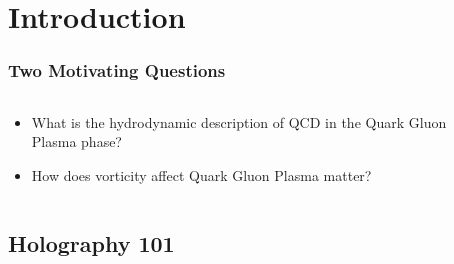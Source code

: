 \documentclass[xcolor=dvipsnames]{beamer}
\title[Exploring Holographic QCD]{}
\author{Markus A.G. Amano}
\date{April 2nd, 2024}
\subtitle{\href{https://inspirehep.net/literature/2690368}{ arXiv:2308.11686 (Amano, Kaminski et al. 2023) }
}
\institute{Yamagata University}
\begin{document}
{
  
}

\maketitle

\section{Introduction}

\begin{frame}
  \frametitle{Two Motivating Questions}

  \begin{columns}[c]
    \begin{column}{0.5\paperwidth}
      \begin{itemize}
        \item What is the hydrodynamic description of QCD in the Quark Gluon Plasma phase?
        \item How does vorticity affect Quark Gluon Plasma matter?
      \end{itemize}
    \end{column}
    \begin{column}{0.5\paperwidth}
    \end{column}
  \end{columns}
\end{frame}

\subsection{Holography 101}
\end{document}
